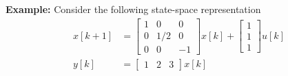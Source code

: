 \documentclass[twoside]{article}
\begin{document}
\textbf{Example:} Consider the following state-space representation
%
\begin{align*}
  x[k+1] &= \left[ \begin{array}{ccc} 1 & 0 & 0\\ 0 & 1/2 & 0
    \\ 0 & 0 & -1 \end{array} \right] x[k] 
    + \left[ \begin{array}{c} 1 \\ 1 \\ 1\end{array} \right] u[k]
\\
 y[k] &= \left[ \begin{array}{ccc} 1 & 2 & 3 \end{array} \right] x[k] 
\end{align*}
%
\end{document}
